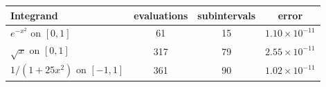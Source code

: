 \begin{tabular}{lccc}
\toprule
Integrand & evaluations & subintervals & error \\
\midrule
$e^{-x^2}$ on $[0,1]$ & 61 & 15 & $1.10\times10^{-11}$ \\
$\sqrt{x}$ on $[0,1]$ & 317 & 79 & $2.55\times10^{-11}$ \\
$1/(1+25x^2)$ on $[-1,1]$ & 361 & 90 & $1.02\times10^{-11}$ \\
\bottomrule
\end{tabular}
